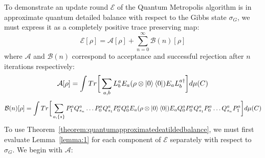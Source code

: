 \documentclass[aps,floatfix,10pt,amssymb,amsfont,amsmath,superscriptaddress,float,nofootinbib,longbibliography,nobalancelastpage,twocolumn]{revtex4-2}
\begin{document}
\begin{widetext}
To demonstrate an update round $\mathcal{E}$ of the Quantum Metropolis algorithm is in approximate quantum detailed balance with respect to the Gibbs state $\sigma_G$, we must express it as a completely positive trace preserving map:
\begin{equation}
    \mathcal{E}[\rho] = \mathcal{A}[\rho] + \sum_{n=0}^{\infty} \mathcal{B}(n)[\rho]
\end{equation}
where $\mathcal{A}$ and $\mathcal{B}(n)$ correspond to acceptance  and successful rejection after $n$ iterations respectively:
\begin{equation}
    \mathcal{A}[\rho] = \int  Tr\bigg[\sum_{a,b}L_b^a E_a ( \rho\otimes \ket{0}\bra{0}) 
     E_aL^{a\dagger}_b\bigg]d\mu(C)
\end{equation}
\begin{equation}
    \mathcal{B}(n)[\rho] = \int Tr\bigg[\sum_{a,\{s\}}P^a_1Q^a_{s_n}\ldots P^a_0Q^a_{s_1}P^a_0Q^a_0E_a ( \rho\otimes \ket{0}\bra{0})E_aQ^a_0P^a_0Q^a_{s_1}P^a_0\ldots Q^a_{s_n}P^a_1\bigg]d\mu(C)
\end{equation}
To use Theorem~\ref{theorem:quantumapproximatedeatildedbalance}, we must first evaluate Lemma~\ref{lemma:1} for each component of $\mathcal{E}$ separately with respect to $\sigma_G$. We begin with $\mathcal{A}$:


\end{widetext}
\end{document}
